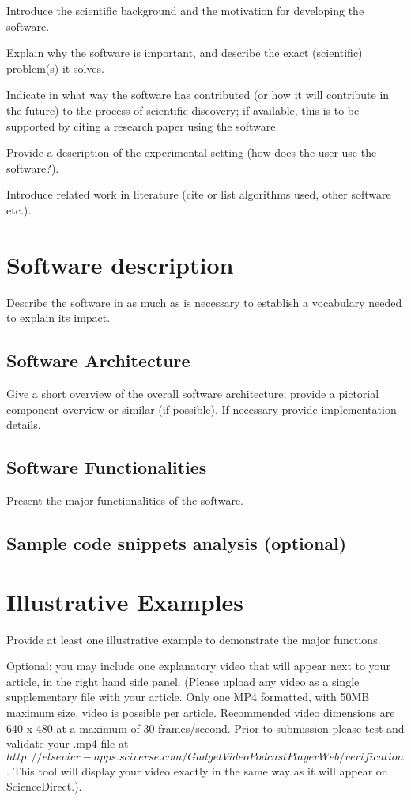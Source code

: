 \documentclass[preprint,12pt, a4paper]{elsarticle}
\begin{document}
Introduce the scientific background and the motivation for developing the software.

Explain why the software is important, and describe the exact (scientific) problem(s) it solves.

Indicate in what way the software has contributed (or how it will contribute in the future) to the process of scientific discovery; if available, this is to be supported by citing a research paper using the software.

Provide a description of the experimental setting (how does the user use the software?).

Introduce related work in literature (cite or list algorithms used, other software etc.).


\section{Software description}
\label{}

Describe the software in as much as is necessary to establish a vocabulary needed to explain its impact. 

\subsection{Software Architecture}
\label{}

Give a short overview of the overall software architecture; provide a pictorial component overview or similar (if possible). If necessary provide implementation details.

\subsection{Software Functionalities}
\label{}

Present the major functionalities of the software.

\subsection{Sample code snippets analysis (optional)}
\label{}

\section{Illustrative Examples}
\label{}

Provide at least one illustrative example to demonstrate the major functions.

Optional: you may include one explanatory video that will appear next to your article, in the right hand side panel. (Please upload any video as a single supplementary file with your article. Only one MP4 formatted, with 50MB maximum size, video is possible per article. Recommended video dimensions are 640 x 480 at a maximum of 30 frames/second. Prior to submission please test and validate your .mp4 file at $ http://elsevier-apps.sciverse.com/GadgetVideoPodcastPlayerWeb/verification$. This tool will display your video exactly in the same way as it will appear on ScienceDirect.).
\end{document}
